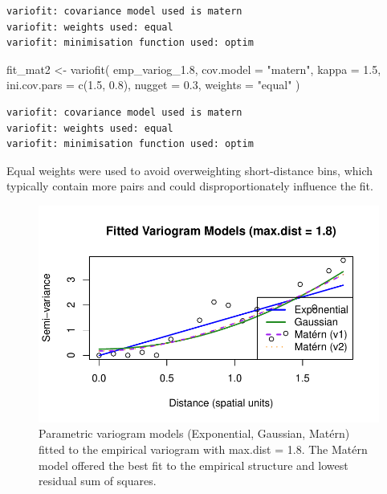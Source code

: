 \documentclass[
  11pt,
]{article}
\newenvironment{Shaded}{\begin{snugshade}}{\end{snugshade}}
\newcommand{\AttributeTok}[1]{\textcolor[rgb]{0.40,0.45,0.13}{#1}}
\newcommand{\FloatTok}[1]{\textcolor[rgb]{0.68,0.00,0.00}{#1}}
\newcommand{\FunctionTok}[1]{\textcolor[rgb]{0.28,0.35,0.67}{#1}}
\newcommand{\NormalTok}[1]{\textcolor[rgb]{0.00,0.23,0.31}{#1}}
\newcommand{\OtherTok}[1]{\textcolor[rgb]{0.00,0.23,0.31}{#1}}
\newcommand{\StringTok}[1]{\textcolor[rgb]{0.13,0.47,0.30}{#1}}
\begin{document}
\begin{verbatim}
variofit: covariance model used is matern 
variofit: weights used: equal 
variofit: minimisation function used: optim 
\end{verbatim}

\begin{Shaded}
\begin{Highlighting}[]
\NormalTok{fit\_mat2 }\OtherTok{\textless{}{-}} \FunctionTok{variofit}\NormalTok{(}
\NormalTok{  emp\_variog\_1}\FloatTok{.8}\NormalTok{,}
  \AttributeTok{cov.model =} \StringTok{"matern"}\NormalTok{,}
  \AttributeTok{kappa =} \FloatTok{1.5}\NormalTok{,}
  \AttributeTok{ini.cov.pars =} \FunctionTok{c}\NormalTok{(}\FloatTok{1.5}\NormalTok{, }\FloatTok{0.8}\NormalTok{),}
  \AttributeTok{nugget =} \FloatTok{0.3}\NormalTok{,}
  \AttributeTok{weights =} \StringTok{"equal"}
\NormalTok{)}
\end{Highlighting}
\end{Shaded}

\begin{verbatim}
variofit: covariance model used is matern 
variofit: weights used: equal 
variofit: minimisation function used: optim 
\end{verbatim}

Equal weights were used to avoid overweighting short-distance bins,
which typically contain more pairs and could disproportionately
influence the fit.

\begin{figure}[H]

{\centering \includegraphics{project_files/figure-pdf/fig-variogfit-1.pdf}

}

\caption{Parametric variogram models (Exponential, Gaussian, Matérn)
fitted to the empirical variogram with max.dist = 1.8. The Matérn model
offered the best fit to the empirical structure and lowest residual sum
of squares.}

\end{figure}%
\end{document}
